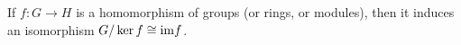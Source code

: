 \documentclass[12pt]{article}
\begin{document}
If $f : G\to H$ is a homomorphism of groups (or rings, or modules), then it induces an isomorphism $G/\ker f \cong {\rm im} f$.
\end{document}
